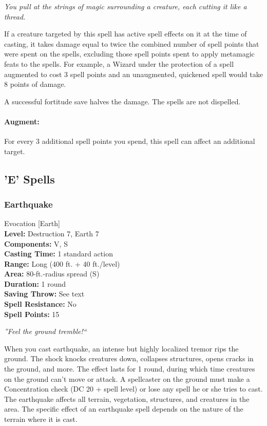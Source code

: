 \emph{You pull at the strings of magic surrounding a creature, each cutting it like a thread.}

If a creature targeted by this spell has active spell effects on it at the time of casting,
it takes damage equal to twice the combined number of spell points that were spent on the spells, 
excluding those spell points spent to apply metamagic feats to the spells.
For example, a Wizard under the protection of a  spell augmented to cost 3 spell points and an unaugmented, quickened  spell
would take 8 points of damage.

A successful fortitude save halves the damage. The spells are not dispelled.
\paragraph{Augment:} For every 3 additional spell points you spend, this spell can affect an additional target.

\subsection{'E' Spells}
\subsubsection{Earthquake}
\label{Spell:Earthquake}
Evocation [Earth]
\\ \textbf{Level:} Destruction 7, Earth 7
\\ \textbf{Components:} V, S
\\ \textbf{Casting Time:} 1 standard action
\\ \textbf{Range:} Long (400 ft. + 40 ft./level)
\\ \textbf{Area:} 80-ft.-radius spread (S)
\\ \textbf{Duration:} 1 round
\\ \textbf{Saving Throw:} See text
\\ \textbf{Spell Resistance:} No
\\ \textbf{Spell Points:} 15

\emph{''Feel the ground tremble!``}

When you cast earthquake, an intense but highly localized tremor rips the ground. 
The shock knocks creatures down, collapses structures, opens cracks in the ground, and more. 
The effect lasts for 1 round, during which time creatures on the ground can't move or attack. 
A spellcaster on the ground must make a Concentration check (DC 20 + spell level) or lose any spell he or she tries to cast. 
The earthquake affects all terrain, vegetation, structures, and creatures in the area. 
The specific effect of an earthquake spell depends on the nature of the terrain where it is cast.

